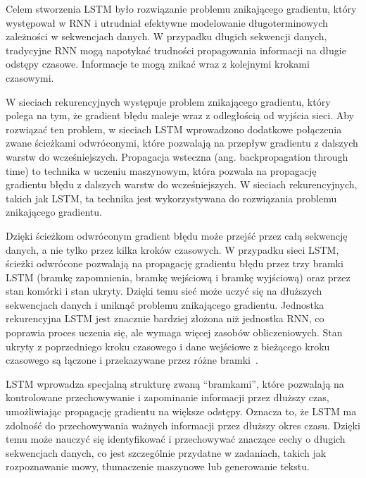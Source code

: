 Celem stworzenia LSTM było rozwiązanie problemu znikającego gradientu, który występował w RNN i utrudniał efektywne modelowanie długoterminowych zależności w sekwencjach danych. W przypadku długich sekwencji danych, tradycyjne RNN mogą napotykać trudności propagowania informacji na długie odstępy czasowe. Informacje te mogą znikać wraz z kolejnymi krokami czasowymi.

W sieciach rekurencyjnych występuje problem znikającego gradientu, który polega na tym, że gradient błędu maleje wraz z odległością od wyjścia sieci. Aby rozwiązać ten problem, w sieciach LSTM wprowadzono dodatkowe połączenia zwane ścieżkami odwróconymi, które pozwalają na przepływ gradientu z dalszych warstw do wcześniejszych. Propagacja wsteczna (ang. backpropagation through time) to technika w uczeniu maszynowym, która pozwala na propagację gradientu błędu z dalszych warstw do wcześniejszych. W sieciach rekurencyjnych, takich jak LSTM, ta technika jest wykorzystywana do rozwiązania problemu znikającego gradientu.

Dzięki ścieżkom odwróconym gradient błędu może przejść przez całą sekwencję danych, a nie tylko przez kilka kroków czasowych. W przypadku sieci LSTM, ścieżki odwrócone pozwalają na propagację gradientu błędu przez trzy bramki LSTM (bramkę zapomnienia, bramkę wejściową i bramkę wyjściową) oraz przez stan komórki i stan ukryty. Dzięki temu sieć może uczyć się na dłuższych sekwencjach danych i uniknąć problemu znikającego gradientu. Jednostka rekurencyjna LSTM jest znacznie bardziej złożona niż jednostka RNN, co poprawia proces uczenia się, ale wymaga więcej zasobów obliczeniowych. Stan ukryty z poprzedniego kroku czasowego i dane wejściowe z bieżącego kroku czasowego są łączone i przekazywane przez różne bramki~\cite{yu2019}.

LSTM wprowadza specjalną strukturę zwaną \enquote{bramkami}, które pozwalają na kontrolowane przechowywanie i zapominanie informacji przez dłuższy czas, umożliwiając propagację gradientu na większe odstępy. Oznacza to, że LSTM ma zdolność do przechowywania ważnych informacji przez dłuższy okres czasu. Dzięki temu może nauczyć się identyfikować i przechowywać znaczące cechy o długich sekwencjach danych, co jest szczególnie przydatne w zadaniach, takich jak rozpoznawanie mowy, tłumaczenie maszynowe lub generowanie tekstu.

